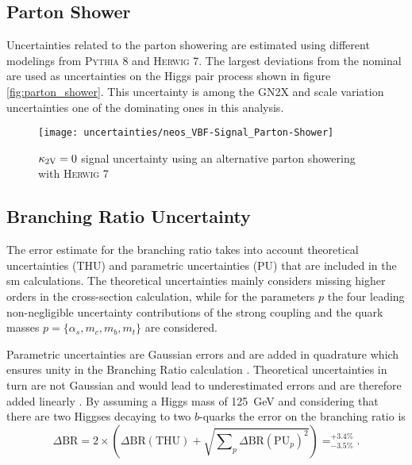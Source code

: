 \subsection{Parton Shower}
Uncertainties related to the parton showering are estimated using different modelings from \textsc{Pythia 8} and \textsc{Herwig 7}. The largest deviations from the nominal are used as uncertainties on the Higgs pair process shown in figure \ref{fig:parton_shower}. This uncertainty is among the GN2X and scale variation uncertainties one of the dominating ones in this analysis.
\begin{figure}
    \centering
    \texttt{[image: uncertainties/neos\_VBF-Signal\_Parton-Shower]}
    \caption[]{$\kappa_{\text{2V}}=0$ signal uncertainty using an alternative parton showering with \textsc{Herwig 7}}
\end{figure}


\subsection{Branching Ratio Uncertainty}
The error estimate for the branching ratio takes into account theoretical uncertainties (THU) and parametric uncertainties (PU) that are included in the \ac{sm} calculations. The theoretical uncertainties mainly considers missing higher orders in the cross-section calculation, while for the parameters $p$ the four leading non-negligible uncertainty contributions of the strong coupling and the quark masses $p=\{\alpha_s,m_c,m_b,m_t\}$ are considered.

Parametric uncertainties are Gaussian errors and are added in quadrature which ensures unity in the Branching Ratio calculation \citep{de2016arxiv}. Theoretical uncertainties in turn are not Gaussian and would lead to underestimated errors and are therefore added linearly \citep{de2016arxiv}. By assuming a Higgs mass of \qty[]{125}{GeV} and considering that there are two Higgses decaying to two $b$-quarks the error on the branching ratio is
\begin{equation}
    \Delta\text{BR} = 2 \times \left(\Delta\text{BR}(\text{THU}) + \sqrt{\sum\nolimits_{p} \Delta\text{BR}(\text{PU}_{p})^2 }\right) = _{-3.5\%}^{+3.4\%}.
\end{equation}

